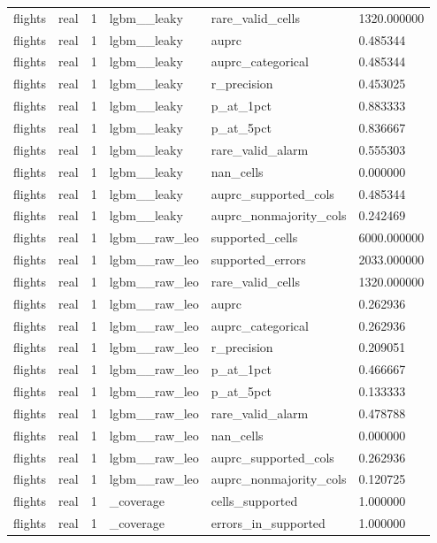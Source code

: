 \begin{tabular}{llllll}
flights & real & 1 & lgbm\_\_leaky & rare\_valid\_cells & 1320.000000 \\
flights & real & 1 & lgbm\_\_leaky & auprc & 0.485344 \\
flights & real & 1 & lgbm\_\_leaky & auprc\_categorical & 0.485344 \\
flights & real & 1 & lgbm\_\_leaky & r\_precision & 0.453025 \\
flights & real & 1 & lgbm\_\_leaky & p\_at\_1pct & 0.883333 \\
flights & real & 1 & lgbm\_\_leaky & p\_at\_5pct & 0.836667 \\
flights & real & 1 & lgbm\_\_leaky & rare\_valid\_alarm & 0.555303 \\
flights & real & 1 & lgbm\_\_leaky & nan\_cells & 0.000000 \\
flights & real & 1 & lgbm\_\_leaky & auprc\_supported\_cols & 0.485344 \\
flights & real & 1 & lgbm\_\_leaky & auprc\_nonmajority\_cols & 0.242469 \\
flights & real & 1 & lgbm\_\_raw\_leo & supported\_cells & 6000.000000 \\
flights & real & 1 & lgbm\_\_raw\_leo & supported\_errors & 2033.000000 \\
flights & real & 1 & lgbm\_\_raw\_leo & rare\_valid\_cells & 1320.000000 \\
flights & real & 1 & lgbm\_\_raw\_leo & auprc & 0.262936 \\
flights & real & 1 & lgbm\_\_raw\_leo & auprc\_categorical & 0.262936 \\
flights & real & 1 & lgbm\_\_raw\_leo & r\_precision & 0.209051 \\
flights & real & 1 & lgbm\_\_raw\_leo & p\_at\_1pct & 0.466667 \\
flights & real & 1 & lgbm\_\_raw\_leo & p\_at\_5pct & 0.133333 \\
flights & real & 1 & lgbm\_\_raw\_leo & rare\_valid\_alarm & 0.478788 \\
flights & real & 1 & lgbm\_\_raw\_leo & nan\_cells & 0.000000 \\
flights & real & 1 & lgbm\_\_raw\_leo & auprc\_supported\_cols & 0.262936 \\
flights & real & 1 & lgbm\_\_raw\_leo & auprc\_nonmajority\_cols & 0.120725 \\
flights & real & 1 & \_coverage & cells\_supported & 1.000000 \\
flights & real & 1 & \_coverage & errors\_in\_supported & 1.000000 \\

\end{tabular}
